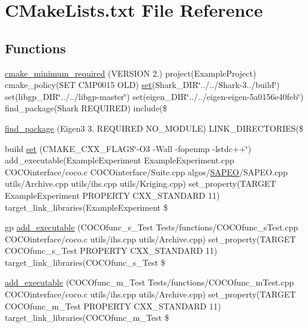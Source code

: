 \hypertarget{CMakeLists_8txt}{}\section{C\+Make\+Lists.\+txt File Reference}
\label{CMakeLists_8txt}
\subsection*{Functions}
\begin{DoxyCompactItemize}
\item 
\hyperlink{CMakeLists_8txt_a327516dd92bf5bb8c826a118b6867a9e}{cmake\+\_\+minimum\+\_\+required} (V\+E\+R\+S\+I\+ON 2.) project(Example\+Project) cmake\+\_\+policy(S\+ET C\+M\+P0015 O\+LD) \hyperlink{CMakeLists_8txt_ad45362c2da5a1add10df245e0386da5f}{set}(Shark\+\_\+\+D\+IR\char`\"{}../../Shark-\/3../build\char`\"{}) set(libgp\+\_\+\+D\+IR\char`\"{}../../libgp-\/master\char`\"{}) set(eigen\+\_\+\+D\+IR\char`\"{}../../eigen-\/eigen-\/5a0156e40feb\char`\"{}) find\+\_\+package(\+Shark R\+E\+Q\+U\+I\+R\+E\+D) include(\$
\item 
\hyperlink{CMakeLists_8txt_a94f74d2f2518600843af67f14ee8549c}{find\+\_\+package} (Eigen3 3. R\+E\+Q\+U\+I\+R\+ED N\+O\+\_\+\+M\+O\+D\+U\+LE) L\+I\+N\+K\+\_\+\+D\+I\+R\+E\+C\+T\+O\+R\+I\+ES(\$
\item 
build \hyperlink{CMakeLists_8txt_ad45362c2da5a1add10df245e0386da5f}{set} (C\+M\+A\+K\+E\+\_\+\+C\+X\+X\+\_\+\+F\+L\+A\+GS\char`\"{}-\/O3 -\/Wall -\/fopenmp -\/lstdc++\char`\"{}) add\+\_\+executable(Example\+Experiment Example\+Experiment.\+cpp C\+O\+C\+Ointerface/coco.\+c C\+O\+C\+Ointerface/Suite.\+cpp algos/\hyperlink{classSAPEO}{S\+A\+P\+EO}/S\+A\+P\+E\+O.\+cpp utils/Archive.\+cpp utils/ihs.\+cpp utils/Kriging.\+cpp) set\+\_\+property(T\+A\+R\+G\+ET Example\+Experiment P\+R\+O\+P\+E\+R\+TY C\+X\+X\+\_\+\+S\+T\+A\+N\+D\+A\+RD 11) target\+\_\+link\+\_\+libraries(Example\+Experiment \$
\item 
gp \hyperlink{CMakeLists_8txt_a77efff426263f0b2c0fe441ed9f8415d}{add\+\_\+executable} (C\+O\+C\+Ofunc\+\_\+s\+\_\+\+Test Tests/functions/C\+O\+C\+Ofunc\+\_\+s\+Test.\+cpp C\+O\+C\+Ointerface/coco.\+c utils/ihs.\+cpp utils/Archive.\+cpp) set\+\_\+property(T\+A\+R\+G\+ET C\+O\+C\+Ofunc\+\_\+s\+\_\+\+Test P\+R\+O\+P\+E\+R\+TY C\+X\+X\+\_\+\+S\+T\+A\+N\+D\+A\+RD 11) target\+\_\+link\+\_\+libraries(C\+O\+C\+Ofunc\+\_\+s\+\_\+\+Test \$
\item 
\hyperlink{CMakeLists_8txt_a3b6b8b0f951e23a299475ccb4bcd94a3}{add\+\_\+executable} (C\+O\+C\+Ofunc\+\_\+m\+\_\+\+Test Tests/functions/C\+O\+C\+Ofunc\+\_\+m\+Test.\+cpp C\+O\+C\+Ointerface/coco.\+c utils/ihs.\+cpp utils/Archive.\+cpp) set\+\_\+property(T\+A\+R\+G\+ET C\+O\+C\+Ofunc\+\_\+m\+\_\+\+Test P\+R\+O\+P\+E\+R\+TY C\+X\+X\+\_\+\+S\+T\+A\+N\+D\+A\+RD 11) target\+\_\+link\+\_\+libraries(C\+O\+C\+Ofunc\+\_\+m\+\_\+\+Test \$

\end{DoxyCompactItemize}
